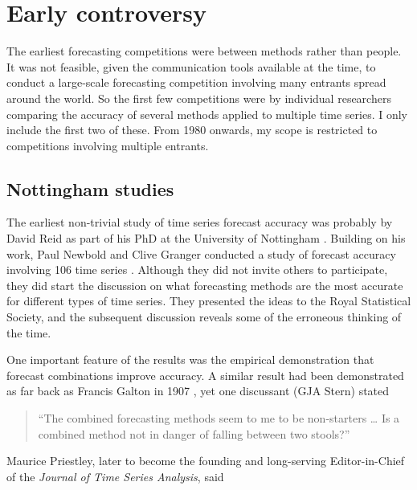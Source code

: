 \documentclass[11pt,a4paper,]{article}
\begin{document}
\hypertarget{sec:controversy}{%
\section{Early controversy}\label{sec:controversy}}

The earliest forecasting competitions were between methods rather than people. It was not feasible, given the communication tools available at the time, to conduct a large-scale forecasting competition involving many entrants spread around the world. So the first few competitions were by individual researchers comparing the accuracy of several methods applied to multiple time series. I only include the first two of these. From 1980 onwards, my scope is restricted to competitions involving multiple entrants.

\hypertarget{nottingham-studies}{%
\subsection*{Nottingham studies}\label{nottingham-studies}}

The earliest non-trivial study of time series forecast accuracy was probably by David Reid as part of his PhD at the University of Nottingham \autocite{reidphd}. Building on his work, Paul Newbold and Clive Granger conducted a study of forecast accuracy involving 106 time series \autocite{NewboldGranger74}. Although they did not invite others to participate, they did start the discussion on what forecasting methods are the most accurate for different types of time series. They presented the ideas to the Royal Statistical Society, and the subsequent discussion reveals some of the erroneous thinking of the time.

One important feature of the results was the empirical demonstration that forecast combinations improve accuracy. A similar result had been demonstrated as far back as Francis Galton in 1907 \autocite{Wallis2014}, yet one discussant (GJA Stern) stated

\begin{quote}
``The combined forecasting methods seem to me to be non-starters \ldots{} Is a combined method not in danger of falling between two stools?''
\end{quote}

Maurice Priestley, later to become the founding and long-serving Editor-in-Chief of the \emph{Journal of Time Series Analysis}, said
\end{document}
